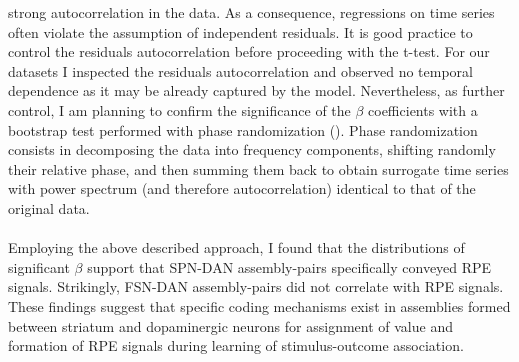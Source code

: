 strong autocorrelation in the data. As a consequence, regressions on time series often violate the assumption of independent residuals. It is good practice to control the residuals autocorrelation before proceeding with the t-test. For our datasets I inspected the residuals autocorrelation and observed no temporal dependence as it may be already captured by the model. Nevertheless, as further control, I am planning to confirm the significance of the $\beta$ coefficients with a bootstrap test performed with phase randomization (\cite{Mokeichev}). Phase randomization consists in decomposing the data into frequency components, shifting randomly their relative phase, and then summing them back to obtain surrogate time series with power spectrum (and therefore autocorrelation) identical to that of the original data.\\\\Employing the above described approach, I found that the distributions of significant $\beta$ support that SPN-DAN assembly-pairs specifically conveyed RPE signals. Strikingly, FSN-DAN assembly-pairs did not correlate with RPE signals. These findings suggest that specific coding mechanisms exist in assemblies formed between striatum and dopaminergic neurons for assignment of value and formation of RPE signals during learning of stimulus-outcome association. \\\\
